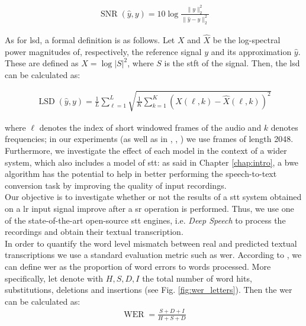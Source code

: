 \begin{align}\label{eq:snr}
	\operatorname{SNR}(\hat{y}, y)=10 \log\frac{\|y\|_{2}^{2}}{\|\hat{y}-y\|_{2}^{2}}
\end{align}

\noindent As for \gls{lsd}, a formal definition is as follows. Let $X$ and $\hat{X}$ be the log-spectral power magnitudes of, respectively, the reference signal $y$ and its approximation $\hat{y}$. These are defined as $X = \log |S|^2$, where $S$ is the \gls{stft} of the signal. Then, the \gls{lsd} can be calculated as: 

\begin{align}\label{eq:lsd}
	\operatorname{LSD}(\hat{y}, y)=\frac{1}{L} \sum_{\ell=1}^{L} \sqrt{\frac{1}{K} \sum_{k=1}^{K}(X(\ell, k)-\hat{X}(\ell, k))^{2}}
\end{align}

\noindent where $\ell$ denotes the index of short windowed frames of the audio and $k$ denotes frequencies; in our experiments (as well as in \cite{kuleshov2017audio}, \cite{lim2018time}, \cite{birnbaum2019temporal}) we use frames of length 2048. \\
Furthermore, we investigate the effect of each model in the context of a wider system, which also includes a model of \gls{stt}: as said in Chapter \ref{chap:intro}, a \gls{bwe} algorithm has the potential to help in better performing the speech-to-text conversion task by improving the quality of input recordings. \\
Our objective is to investigate whether or not the results of a \gls{stt} system obtained on a \gls{lr} input signal improve after a \gls{sr} operation is performed. Thus, we use one of the state-of-the-art open-source \gls{stt} engines, i.e. \textit{Deep Speech} \cite{hannun2014deep} to process the recordings and obtain their textual transcription. \\
In order to quantify the word level mismatch between real and predicted textual transcriptions we use a standard evaluation metric such as \gls{wer}. According to \cite{morris2004and}, we can define \gls{wer} as the proportion of word errors to words processed. More specifically, let denote with $H, S, D, I$ the total number of word hits, substitutions, deletions and insertions (see Fig. \ref{fig:wer_letters}). Then the \gls{wer} can be calculated as:
\begin{align}\label{eq:wer}
	\operatorname{WER} =\frac{S + D + I}{H + S + D}
\end{align}

